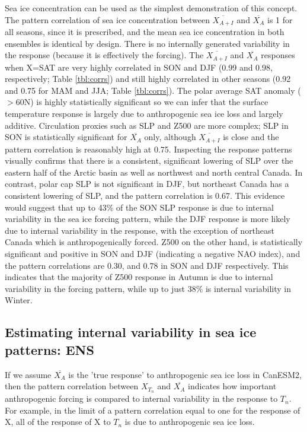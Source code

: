 \documentclass[12pt]{article}
\begin{document}
Sea ice concentration can be used as the simplest demonstration of this concept. The pattern correlation of sea ice concentration between $\overline{X_{A+I}}$ and $\overline{X_{A}}$ is 1 for all seasons, since it is prescribed, and the mean sea ice concentration in both ensembles is identical by design. There is no internally generated variability in the response (because it is effectively the forcing). The $\overline{X_{A+I}}$ and $\overline{X_{A}}$ responses when X=SAT are very highly correlated in SON and DJF (0.99 and 0.98, respectively; Table \ref{tbl:corrs}) and still highly correlated in other seasons (0.92 and 0.75 for MAM and JJA; Table \ref{tbl:corrs}). The polar average SAT anomaly ($>$60N) is highly statistically significant so we can infer that the surface temperature response is largely due to anthropogenic sea ice loss and largely additive. Circulation proxies such as SLP and Z500 are more complex; SLP in SON is statistically significant for $\overline{X_{A}}$ only, although $\overline{X_{A+I}}$ is close and the pattern correlation is reasonably high at 0.75. Inspecting the response patterns visually confirms that there is a consistent, significant lowering of SLP over the eastern half of the Arctic basin as well as northwest and north central Canada. In contrast, polar cap SLP is not significant in DJF, but northeast Canada has a consistent lowering of SLP, and the pattern correlation is 0.67. This evidence would suggest that up to 43\% of the SON SLP response is due to internal variability in the sea ice forcing pattern, while the DJF response is more likely due to internal variability in the response, with the exception of northeast Canada which is anthropogenically forced. Z500 on the other hand, is statistically significant and positive in SON and DJF (indicating a negative NAO index), and the pattern correlations are 0.30, and 0.78 in SON and DJF respectively. This indicates that the majority of Z500 response in Autumn is due to internal variability in the forcing pattern, while up to just 38\% is internal variability in Winter. 

\subsection{Estimating internal variability in sea ice patterns: ENS}

If we assume $\overline{X_{A}}$ is the 'true response' to anthropogenic sea ice loss in CanESM2, then the pattern correlation between $X_{T_n}$  and $\overline{X_{A}}$ indicates how important anthropogenic forcing is compared to internal variability in the response to $T_n$. For example, in the limit of a pattern correlation equal to one for the response of X, all of the response of X to $T_n$ is due to anthropogenic sea ice loss. 
\end{document}
